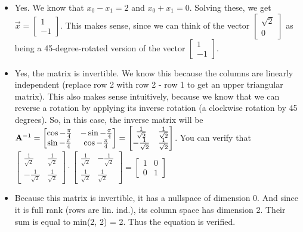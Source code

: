{\begin{itemize}
        \item Yes. We know that $x_0 - x_1 = 2$ and $x_0 + x_1 = 0$. Solving these, we get $\vec{x} = \begin{bmatrix}1 \\ -1\end{bmatrix}$. This makes sense, since we can think of the vector $\begin{bmatrix}\sqrt{2} \\ 0\end{bmatrix}$ as being a 45-degree-rotated version of the vector $\begin{bmatrix}1 \\ -1\end{bmatrix}$.
        \item Yes, the matrix is invertible. We know this because the columns are linearly independent (replace row 2 with row 2 - row 1 to get an upper triangular matrix). This also makes sense intuitively, because we know that we can reverse a rotation by applying its inverse rotation (a clockwise rotation by 45 degrees). So, in this case, the inverse matrix will be
        $\mathbf{A}^{-1} = \begin{bmatrix}
            \cos{-\frac{\pi}{4}} & -\sin{-\frac{\pi}{4}} \\
            \sin{-\frac{\pi}{4}} & \cos{-\frac{\pi}{4}}
        \end{bmatrix}
         = \begin{bmatrix}
            \frac{1}{\sqrt{2}} & \frac{1}{\sqrt{2}} \\
            -\frac{1}{\sqrt{2}} & \frac{1}{\sqrt{2}}
        \end{bmatrix}$.
        You can verify that $\begin{bmatrix}
            \frac{1}{\sqrt{2}} & \frac{1}{\sqrt{2}} \\
            -\frac{1}{\sqrt{2}} & \frac{1}{\sqrt{2}}
        \end{bmatrix}
        \cdot \begin{bmatrix}
            \frac{1}{\sqrt{2}} & -\frac{1}{\sqrt{2}} \\
            \frac{1}{\sqrt{2}} & \frac{1}{\sqrt{2}}
        \end{bmatrix}
        = \begin{bmatrix}
            1 & 0 \\
            0 & 1
        \end{bmatrix}$
        \item Because this matrix is invertible, it has a nullspace of dimension 0. And since it is full rank (rows are lin. ind.), its column space has dimension 2. Their sum is equal to min(2, 2) = 2. Thus the equation is verified.
    \end{itemize}
}

